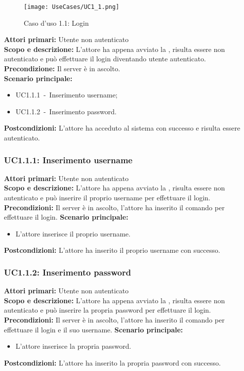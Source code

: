 \documentclass{scalatekids-article}
\begin{document}
\begin{figure}[H]
  \begin{center}
    \texttt{[image: UseCases/UC1\_1.png]}
    \caption{Caso d'uso 1.1: Login}
  \end{center}
\end{figure}
\textbf{Attori primari:} Utente non autenticato\\
\textbf{Scopo e descrizione:}
L’attore ha appena avviato la , risulta essere non autenticato e può effettuare il login diventando utente
autenticato.\\
\textbf{Precondizione:} Il server è in ascolto.\\
\textbf{Scenario principale:}
\begin{itemize}
\item UC1.1.1\ -\ Inserimento username;
\item UC1.1.2\ -\ Inserimento password.
\end{itemize}
\textbf{Postcondizioni:} L'attore ha acceduto al sistema con successo e risulta essere autenticato.

\subsubsection{UC1.1.1: Inserimento username}

\textbf{Attori primari:} Utente non autenticato\\
\textbf{Scopo e descrizione:}
L'attore ha appena avviato la , risulta essere non autenticato e può inserire il proprio username per effettuare il login.\\
\textbf{Precondizioni:} Il server è in ascolto, l'attore ha inserito il comando per effettuare il login.
\textbf{Scenario principale:}
\begin{itemize}
\item L'attore inserisce il proprio username.
\end{itemize}
\textbf{Postcondizioni:} L'attore ha inserito il proprio username con successo.

\subsubsection{UC1.1.2: Inserimento password}

\textbf{Attori primari:} Utente non autenticato\\
\textbf{Scopo e descrizione:}
L'attore ha appena avviato la , risulta essere non autenticato e può inserire la propria password per effettuare il login.\\
\textbf{Precondizioni:} Il server è in ascolto, l'attore ha inserito il comando per effettuare il login e il suo username.
\textbf{Scenario principale:}
\begin{itemize}
\item L'attore inserisce la propria password.
\end{itemize}
\textbf{Postcondizioni:} L'attore ha inserito la propria password con successo.
\end{document}
